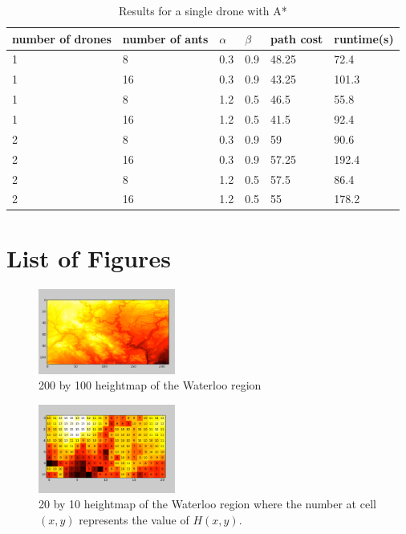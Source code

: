 \documentclass[conference]{IEEEtran}
\begin{document}
\begin{table}[H]
\centering
\begin{tabular}{ | m{1cm} | m{1cm}| m{1cm} | m{1.5cm} | m{1.5cm} | m{1.5cm}} 
\hline
number of drones & number of ants & $\alpha$ & $\beta$ & path cost & runtime(s) \\ 
\hline
1 & 8 & 0.3 & 0.9 & 48.25 & 72.4 \\
\hline
1 & 16 & 0.3 & 0.9 & 43.25 & 101.3 \\ 
\hline
1 & 8 & 1.2 & 0.5 & 46.5 & 55.8 \\
\hline
1 & 16 & 1.2 & 0.5 & 41.5 & 92.4 \\
\hline
2 & 8 & 0.3 & 0.9 & 59 & 90.6 \\
\hline
2 & 16 & 0.3 & 0.9 & 57.25 & 192.4 \\ 
\hline
2 & 8 & 1.2 & 0.5 & 57.5 & 86.4 \\
\hline
2 & 16 & 1.2 & 0.5 & 55 & 178.2 \\
\hline
\end{tabular}
\caption{Results for a single drone with A*} \label{tab:random}
\end{table}

\newpage
\phantom{Blah}
\newpage

\section{List of Figures}
\begin{figure}[H]
\centerline{\includegraphics[width=0.4\textwidth]{images/heightmap_orig.png}}
\caption{200 by 100 heightmap of the Waterloo region}
\label{img:heightmap1}
\end{figure}

\begin{figure}[H] 
\centerline{\includegraphics[width=0.4\textwidth]{images/heightmap.png}}
\caption{20 by 10 heightmap of the Waterloo region where the number at cell $(x, y)$ represents the value of $H(x, y)$.}
\label{img:heightmap2}
\end{figure}
\end{document}
